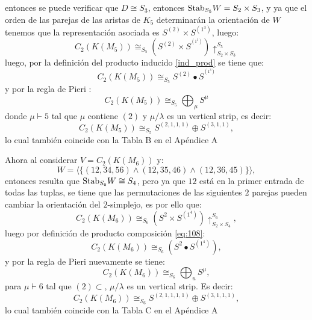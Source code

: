 \documentclass[12pt]{book}
\theoremstyle{definition}
\newcounter{in}
\newcounter{ini}
\begin{document}
entonces se puede verificar que $D \cong S_{3}$, entonces $\textup{Stab}_{S_{5}} W = S_{2} \times S_{3}$,
y ya que el orden de las parejas de las aristas de $K_{5}$ determinarán la orientación de $W$ tenemos que la representación asociada es $S^{(2)} \times S^{(1^{3})}$, luego:
\begin{equation}
C_{2}(K(M_{5})) \cong_{S_{5}} (S^{(2)} \times S^{^{(1^{3})}}) \uparrow_{S_{2} \times S_{3}}^{S_{5}}
\end{equation}
luego, por la definición del producto inducido \ref{ind_prod} se tiene que:
\begin{equation*}
C_{2}(K(M_{5})) \cong_{S_{5}} S^{(2)} \bullet S^{^{(1^{3})}}
\end{equation*}
y por la regla de Pieri \cite{wachs2006poset}:
\begin{equation*}
C_{2}(K(M_{5})) \cong_{S_{5}} \bigoplus_{\mu} S^{\mu}
\end{equation*}
donde $\mu \vdash 5$ tal que $\mu$ contiene $(2)$ y $\mu / \lambda$ es un vertical strip, es decir:
\begin{equation*}
C_{2}(K(M_{5})) \cong_{S_{5}} S^{(2,1,1,1)} \oplus S^{(3,1,1)},
\end{equation*}
lo cual también coincide con la Tabla B en el Apéndice A 


Ahora al considerar $V = C_{2}(K(M_{6}))$ y:
$$W = \langle \{(12,34,56) \wedge (12,35,46) \wedge (12,36,45) \} \rangle,$$
entonces resulta que $\textup{Stab}_{S_{6}} W \cong S_{4}$, pero ya que $12$ está en la primer entrada de todas las tuplas, se tiene que las permutaciones de las siguientes $2$ parejas pueden cambiar la orientación del $2$-simplejo, es por ello que:
\begin{equation}
C_{2}(K(M_{6}))  \cong_{S_{6}} (S^{2} \times S^{(1^{4})}) \uparrow_{S_{2} \times S_{4}}^{S_{6}},
\end{equation}
luego por definición de producto composición \ref{eq:108}:
\begin{equation}
C_{2}(K(M_{6}))  \cong_{S_{6}} (S^{2} \bullet S^{(1^{4})}),
\end{equation}
y por la regla de Pieri \cite{wachs2006poset} nuevamente se tiene:
\begin{equation*}
C_{2}(K(M_{6})) \cong_{S_{6}} \bigoplus_{u} S^{\mu}, 
\end{equation*}
para $\mu \vdash 6$ tal que $(2) \subset $, $\mu / \lambda$ es un vertical strip. Es decir:
\begin{equation*}
C_{2}(K(M_{6})) \cong_{S_{6}} S^{(2,1,1,1,1)} \oplus S^{(3,1,1,1)},
\end{equation*}
lo cual también coincide con la Tabla C en el Apéndice A 
\end{document}
